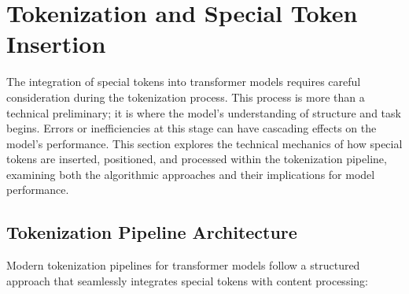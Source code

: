\section{Tokenization and Special Token Insertion}

The integration of special tokens into transformer models requires careful consideration during the tokenization process. This process is more than a technical preliminary; it is where the model's understanding of structure and task begins. Errors or inefficiencies at this stage can have cascading effects on the model's performance. This section explores the technical mechanics of how special tokens are inserted, positioned, and processed within the tokenization pipeline, examining both the algorithmic approaches and their implications for model performance.

\subsection{Tokenization Pipeline Architecture}

Modern tokenization pipelines for transformer models follow a structured approach that seamlessly integrates special tokens with content processing:

